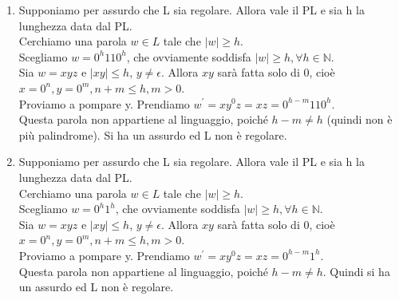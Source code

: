 \documentclass[a4paper,11pt]{article}
\begin{document}
\begin{enumerate}
        \item Supponiamo per assurdo che L sia regolare. Allora vale il PL e sia h la lunghezza data dal PL.\\
        Cerchiamo una parola $w\in L$ tale che $|w|\geq h$.\\
        Scegliamo $w=0^h110^h$, che ovviamente soddisfa $|w|\geq h, \forall h \in \mathbb{N}$.\\
        Sia $w=xyz$ e $|xy|\leq h$, $y\neq\epsilon$. Allora $xy$ sarà fatta solo di $0$, cioè $x=0^n, y=0^m, n+m\leq h, m>0$.\\
        Proviamo a pompare y. Prendiamo $w^{'}=xy^0z=xz=0^{h-m}110^h$.\\Questa parola non appartiene al linguaggio, poiché $h-m\neq h$ (quindi non è più palindrome). Si ha un assurdo ed L non è regolare.
        \item Supponiamo per assurdo che L sia regolare. Allora vale il PL e sia h la lunghezza data dal PL.\\
        Cerchiamo una parola $w\in L$ tale che $|w|\geq h$.\\
        Scegliamo $w=0^h1^h$, che ovviamente soddisfa $|w|\geq h, \forall h \in \mathbb{N}$.\\
        Sia $w=xyz$ e $|xy|\leq h$, $y\neq\epsilon$. Allora $xy$ sarà fatta solo di $0$, cioè $x=0^n, y=0^m, n+m\leq h, m>0$.\\
        Proviamo a pompare y. Prendiamo $w^{'}=xy^0z=xz=0^{h-m}1^h$.\\Questa parola non appartiene al linguaggio, poiché $h-m\neq h$. Quindi si ha un assurdo ed L non è regolare.
    \end{enumerate}
    
\end{document}

